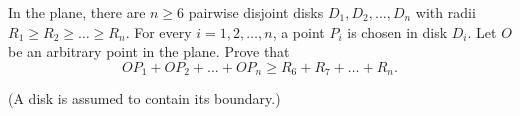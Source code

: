 In the plane, there are $n \geq 6$ pairwise disjoint disks $D_1, D_2, \ldots, D_n$ with radii $R_1 \geq R_2 \geq \ldots \geq R_n$. For every $i = 1, 2, \ldots, n$, a point $P_i$ is chosen in disk $D_i$. Let $O$ be an arbitrary point in the plane. Prove that
\[
OP_1 + OP_2 + \ldots + OP_n \geq R_6 + R_7 + \ldots + R_n.
\]

(A disk is assumed to contain its boundary.)
